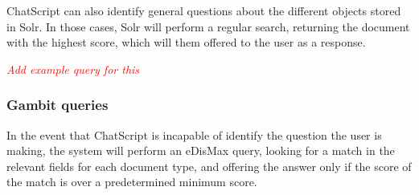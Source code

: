 ChatScript can also identify general questions about the different objects stored in Solr. In those cases, Solr will perform a regular search, returning the document with the highest score, which will them offered to the user as a response.

\emph{\textcolor{red}{Add example query for this}}

\subsubsection{Gambit queries}

In the event that ChatScript is incapable of identify the question the user is making, the system will perform an \ac{eDisMax} query, looking for a match in the relevant fields for each document type, and offering the answer only if the score of the match is over a predetermined minimum score.